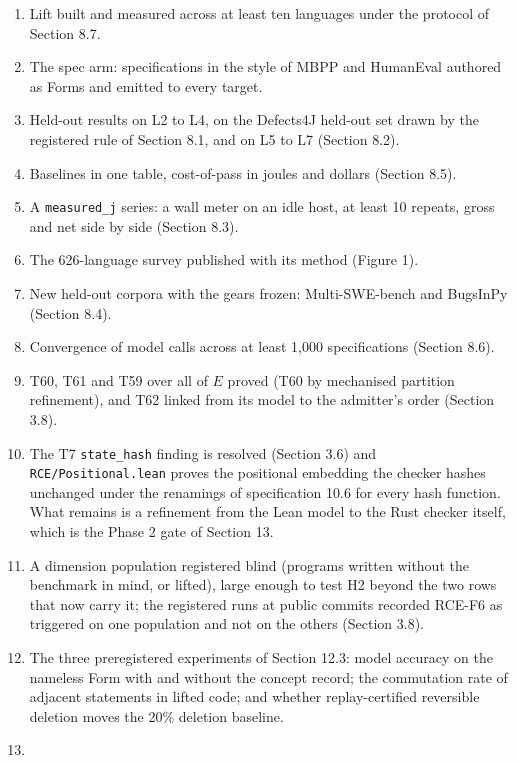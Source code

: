 \documentclass[10pt,letterpaper]{article}
\providecommand{\tightlist}{\setlength{\itemsep}{1pt}\setlength{\parskip}{0pt}}
\begin{document}
\begin{enumerate}
\def\labelenumi{\arabic{enumi}.}
\tightlist
\item
  Lift built and measured across at least ten languages under the
  protocol of Section 8.7.
\item
  The spec arm: specifications in the style of MBPP and HumanEval
  authored as Forms and emitted to every target.
\item
  Held-out results on L2 to L4, on the Defects4J held-out set drawn by
  the registered rule of Section 8.1, and on L5 to L7 (Section 8.2).
\item
  Baselines in one table, cost-of-pass in joules and dollars (Section
  8.5).
\item
  A \texttt{measured\_j} series: a wall meter on an idle host, at least
  10 repeats, gross and net side by side (Section 8.3).
\item
  The 626-language survey published with its method (Figure 1).
\item
  New held-out corpora with the gears frozen: Multi-SWE-bench and
  BugsInPy (Section 8.4).
\item
  Convergence of model calls across at least 1,000 specifications
  (Section 8.6).
\item
  T60, T61 and T59 over all of \(E\) proved (T60 by mechanised partition
  refinement), and T62 linked from its model to the admitter's order
  (Section 3.8).
\item
  The T7 \texttt{state\_hash} finding is resolved (Section 3.6) and
  \texttt{RCE/\allowbreak{}Positional.\allowbreak{}lean} proves the positional embedding the
  checker hashes unchanged under the renamings of specification 10.6 for
  every hash function. What remains is a refinement from the Lean model
  to the Rust checker itself, which is the Phase 2 gate of Section 13.
\item
  A dimension population registered blind (programs written without the
  benchmark in mind, or lifted), large enough to test H2 beyond the two
  rows that now carry it; the registered runs at public commits recorded
  RCE-F6 as triggered on one population and not on the others (Section
  3.8).
\item
  The three preregistered experiments of Section 12.3: model accuracy on
  the nameless Form with and without the concept record; the commutation
  rate of adjacent statements in lifted code; and whether
  replay-certified reversible deletion moves the 20\% deletion baseline.
\item

\end{enumerate}
\end{document}

